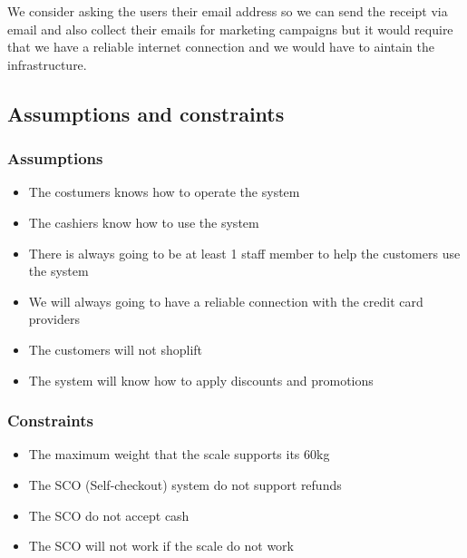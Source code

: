 We consider asking the users their email address so we can send the receipt 
via email and also collect their emails for marketing campaigns but it would 
require that we have a reliable internet connection and we would have to 
aintain the infrastructure.\newline


\subsection{Assumptions and constraints}
\subsubsection{Assumptions}
\begin{itemize}
    \item The costumers knows how to operate the system
    \item The cashiers know how to use the system
    \item There is always going to be at least 1 staff member to help the 
    customers use the system
    \item We will always going to have a reliable connection with the credit 
    card providers
    \item The customers will not shoplift
    \item The system will know how to apply discounts and promotions
\end{itemize}

\subsubsection{Constraints}
\begin{itemize}
    \item The maximum weight that the scale supports its 60kg
    \item The SCO (Self-checkout) system do not support refunds
    \item The SCO do not accept cash
    \item The SCO will not work if the scale do not work
\end{itemize}
